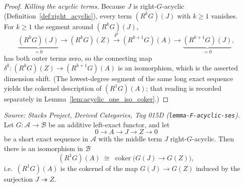 \begin{proof}
  \emph{Killing the acyclic terms.} Because \(J\) is right-\(G\)-acyclic
  (Definition~\ref{def:right_acyclic}), every term \((R^k G)(J)\) with \(k \geq 1\)
  vanishes. For \(k \geq 1\) the segment around \((R^k G)(J)\),
  \[
    \underbrace{(R^{k} G)(J)}_{=0} \to (R^{k} G)(Z)
      \xrightarrow{\ \delta^k\ } (R^{k+1} G)(A) \to \underbrace{(R^{k+1} G)(J)}_{=0},
  \]
  has both outer terms zero, so the connecting map
  \(\delta^k : (R^{k} G)(Z) \to (R^{k+1} G)(A)\) is an isomorphism, which is the
  asserted dimension shift. (The lowest-degree segment of the same long exact
  sequence yields the cokernel description of \((R^1 G)(A)\); that reading is
  recorded separately in Lemma~\ref{lem:acyclic_one_iso_coker}.)
\end{proof}

\begin{lemma}
  \label{lem:acyclic_one_iso_coker}
  \textit{Source: Stacks Project, Derived Categories, Tag 015D
  (\texttt{lemma-F-acyclic-ses}).}
  Let \(G : \mathcal{A} \to \mathcal{B}\) be an additive left-exact functor, and let
  \[
    0 \longrightarrow A \longrightarrow J \longrightarrow Z \longrightarrow 0
  \]
  be a short exact sequence in \(\mathcal{A}\) with the middle term \(J\)
  right-\(G\)-acyclic. Then there is an isomorphism in \(\mathcal{B}\)
  \[
    (R^{1} G)(A) \;\cong\; \operatorname{coker}\bigl(G(J) \to G(Z)\bigr),
  \]
  i.e.\ \((R^1 G)(A)\) is the cokernel of the map \(G(J) \to G(Z)\) induced by the
  surjection \(J \twoheadrightarrow Z\).
\end{lemma}

